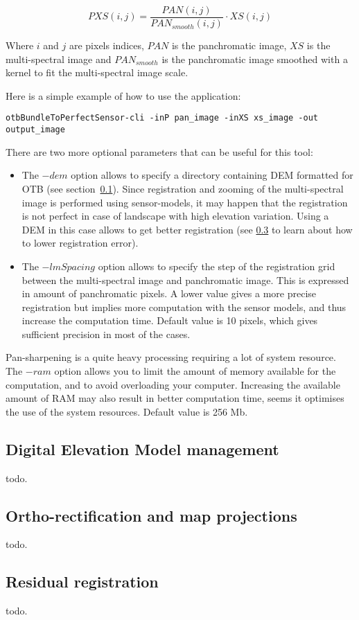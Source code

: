 \begin{equation}
PXS(i,j) = \frac{PAN(i,j)}{PAN_{smooth}(i,j)} \cdot XS(i,j)
\end{equation}

Where $i$ and $j$ are pixels indices, $PAN$ is the panchromatic image,
$XS$ is the multi-spectral image and $PAN_{smooth}$ is the
panchromatic image smoothed with a kernel to fit the multi-spectral
image scale.

Here is a simple example of how to use the
 application:

\begin{verbatim}
otbBundleToPerfectSensor-cli -inP pan_image -inXS xs_image -out output_image
\end{verbatim}

There are two more optional parameters that can be useful for this
tool:
\begin{itemize}
\item The $-dem$ option allows to specify a directory containing DEM
  formatted for OTB (see section~\ref{ssec:dem}). Since registration
  and zooming of the multi-spectral image is performed using
  sensor-models, it may happen that the registration is not perfect in
  case of landscape with high elevation variation. Using a DEM in this
  case allows to get better registration (see \ref{ssec:registration}
  to learn about how to lower registration error).
\item The $-lmSpacing$ option allows to specify the step of the
  registration grid between the multi-spectral image and panchromatic
  image. This is expressed in amount of panchromatic pixels. A lower
  value gives a more precise registration but implies more computation
  with the sensor models, and thus increase the computation
  time. Default value is 10 pixels, which gives sufficient precision
  in most of the cases.
\end{itemize}

Pan-sharpening is a quite heavy processing requiring a lot of system
resource. The $-ram$ option allows you to limit the amount of memory
available for the computation, and to avoid overloading your
computer. Increasing the available amount of RAM may also result in
better computation time, seems it optimises the use of the system
resources. Default value is 256 Mb.

\subsection{Digital Elevation Model management}\label{ssec:dem}

todo.

\subsection{Ortho-rectification and map projections}\label{ssec:ortho}

todo.

\subsection{Residual registration}\label{ssec:registration}

todo.
